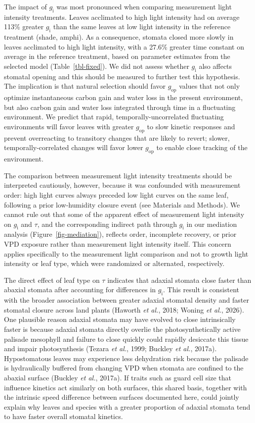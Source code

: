 \documentclass[
  letterpaper,
  DIV=11,
  numbers=noendperiod]{scrartcl}
\newcommand{\gi}{$g_\mathrm{i}$}
\newcommand{\gop}{$g_\mathrm{op}$}
\begin{document}
The impact of \gi{} was most pronounced when comparing measurement light
intensity treatments. Leaves acclimated to high light intensity had on
average 113\% greater \gi{} than the same leaves at low light intensity
in the reference treatment (shade, amphi). As a consequence, stomata
closed more slowly in leaves acclimated to high light intensity, with a
27.6\% greater time constant on average in the reference treatment,
based on parameter estimates from the selected model
(Table~\ref{tbl-fixed}). We did not assess whether \gi{} also affects
stomatal opening and this should be measured to further test this
hypothesis. The implication is that natural selection should favor
\gop{} values that not only optimize instantaneous carbon gain and water
loss in the present environment, but also carbon gain and water loss
integrated through time in a fluctuating environment. We predict that
rapid, temporally-uncorrelated fluctuating environments will favor
leaves with greater \gop{} to slow kinetic responses and prevent
overreacting to transitory changes that are likely to revert; slower,
temporally-correlated changes will favor lower \gop{} to enable close
tracking of the environment.

The comparison between measurement light intensity treatments should be
interpreted cautiously, however, because it was confounded with
measurement order: high light curves always preceded low light curves on
the same leaf, following a prior low-humidity closure event (see
Materials and Methods). We cannot rule out that some of the apparent
effect of measurement light intensity on \gi{} and \(\tau\), and the
corresponding indirect path through \gi{} in our mediation analysis
(Figure~\ref{fig-mediation}), reflects order, incomplete recovery, or
prior VPD exposure rather than measurement light intensity itself. This
concern applies specifically to the measurement light comparison and not
to growth light intensity or leaf type, which were randomized or
alternated, respectively.

The direct effect of leaf type on \(\tau\) indicates that adaxial
stomata close faster than abaxial stomata after accounting for
differences in \gi{}. This result is consistent with the broader
association between greater adaxial stomatal density and faster stomatal
closure across land plants (Haworth \emph{et al.}, 2018; Woning \emph{et
al.}, 2026). One plausible reason adaxial stomata may have evolved to
close intrinsically faster is because adaxial stomata directly overlie
the photosynthetically active palisade mesophyll and failure to close
quickly could rapidly desiccate this tissue and impair photosynthesis
(Tezara \emph{et al.}, 1999; Buckley \emph{et al.}, 2017a).
Hypostomatous leaves may experience less dehydration risk because the
palisade is hydraulically buffered from changing VPD when stomata are
confined to the abaxial surface (Buckley \emph{et al.}, 2017a). If
traits such as guard cell size that influence kinetics act similarly on
both surfaces, this shared basis, together with the intrinsic speed
difference between surfaces documented here, could jointly explain why
leaves and species with a greater proportion of adaxial stomata tend to
have faster overall stomatal kinetics.
\end{document}
